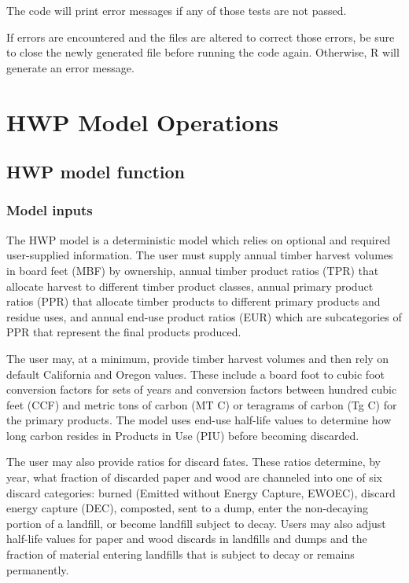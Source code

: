 \documentclass[
  openany]{book}
\begin{document}
The code will print error messages if any of those tests are not passed.

If errors are encountered and the files are altered to correct those errors, be sure to close the newly generated file before running the code again. Otherwise, R will generate an error message.

\hypertarget{model}{%
\chapter{HWP Model Operations}\label{model}}

\hypertarget{model-func}{%
\section{HWP model function}\label{model-func}}

\hypertarget{model-func-inp}{%
\subsection{Model inputs}\label{model-func-inp}}

The HWP model is a deterministic model which relies on optional and required user-supplied information. The user must supply annual timber harvest volumes in board feet (MBF) by ownership, annual timber product ratios (TPR) that allocate harvest to different timber product classes, annual primary product ratios (PPR) that allocate timber products to different primary products and residue uses, and annual end-use product ratios (EUR) which are subcategories of PPR that represent the final products produced.

The user may, at a minimum, provide timber harvest volumes and then rely on default California and Oregon values. These include a board foot to cubic foot conversion factors for sets of years and conversion factors between hundred cubic feet (CCF) and metric tons of carbon (MT C) or teragrams of carbon (Tg C) for the primary products. The model uses end-use half-life values to determine how long carbon resides in Products in Use (PIU) before becoming discarded.

The user may also provide ratios for discard fates. These ratios determine, by year, what fraction of discarded paper and wood are channeled into one of six discard categories: burned (Emitted without Energy Capture, EWOEC), discard energy capture (DEC), composted, sent to a dump, enter the non-decaying portion of a landfill, or become landfill subject to decay. Users may also adjust half-life values for paper and wood discards in landfills and dumps and the fraction of material entering landfills that is subject to decay or remains permanently.
\end{document}
